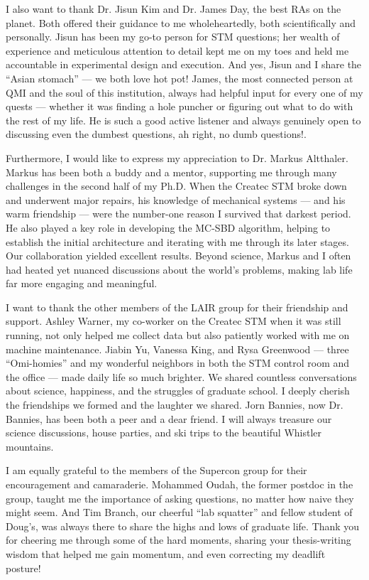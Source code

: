 I also want to thank Dr. Jisun Kim and Dr. James Day, the best RAs on the planet. Both offered their guidance to me wholeheartedly, both scientifically and personally. Jisun has been my go-to person for STM questions; her wealth of experience and meticulous attention to detail kept me on my toes and held me accountable in experimental design and execution. And yes, Jisun and I share the “Asian stomach” — we both love hot pot! James, the most connected person at QMI and the soul of this institution, always had helpful input for every one of my quests — whether it was finding a hole puncher or figuring out what to do with the rest of my life. He is such a good active listener and always genuinely open to discussing even the dumbest questions, ah right, no dumb questions!. 

Furthermore, I would like to express my appreciation to Dr. Markus Altthaler. Markus has been both a buddy and a mentor, supporting me through many challenges in the second half of my Ph.D. When the Createc STM broke down and underwent major repairs, his knowledge of mechanical systems — and his warm friendship — were the number-one reason I survived that darkest period. He also played a key role in developing the MC-SBD algorithm, helping to establish the initial architecture and iterating with me through its later stages. Our collaboration yielded excellent results. Beyond science, Markus and I often had heated yet nuanced discussions about the world’s problems, making lab life far more engaging and meaningful.

I want to thank the other members of the LAIR group for their friendship and support. Ashley Warner, my co-worker on the Createc STM when it was still running, not only helped me collect data but also patiently worked with me on machine maintenance. Jiabin Yu, Vanessa King, and Rysa Greenwood —  three “Omi-homies” and my wonderful neighbors in both the STM control room and the office — made daily life so much brighter. We shared countless conversations about science, happiness, and the struggles of graduate school. I deeply cherish the friendships we formed and the laughter we shared. Jorn Bannies, now Dr. Bannies, has been both a peer and a dear friend. I will always treasure our science discussions, house parties, and ski trips to the beautiful Whistler mountains.

I am equally grateful to the members of the Supercon group for their encouragement and camaraderie. Mohammed Oudah, the former postdoc in the group, taught me the importance of asking questions, no matter how naive they might seem. And Tim Branch, our cheerful “lab squatter” and fellow student of Doug’s, was always there to share the highs and lows of graduate life. Thank you for cheering me through some of the hard moments, sharing your thesis-writing wisdom that helped me gain momentum, and even correcting my deadlift posture!


